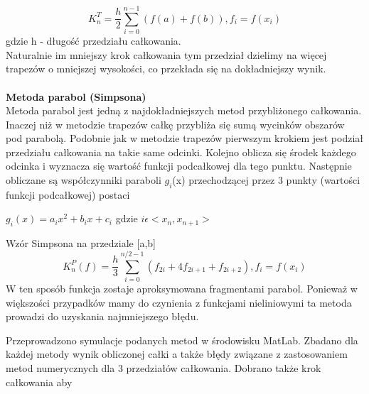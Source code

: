 \documentclass{article}
\begin{document}
		\begin{equation}	
		K_{n}^{T}=\frac{h}{2}\sum_{i=0}^{n-1} \left(f(a)+f(b)\right)  , f_{i} = f\left(x_{i}\right)
		\end{equation}
		gdzie h - długość przedziału całkowania.\\
		Naturalnie im mniejszy krok całkowania tym przedział dzielimy na więcej trapezów o mniejszej wysokości, co przekłada się na dokładniejszy wynik. 
		\\\\
		\textbf {Metoda parabol (Simpsona)}
		\\ 
		Metoda parabol jest jedną z najdokładniejszych metod przybliżonego całkowania. Inaczej niż w metodzie trapezów całkę przybliża się sumą wycinków obszarów pod parabolą. Podobnie jak w metodzie trapezów pierwszym krokiem jest podział przedziału całkowania na takie same odcinki. Kolejno oblicza się środek każdego odcinka i wyznacza się wartość funkcji podcałkowej dla tego punktu. Następnie obliczane są współczynniki paraboli $g_{i}$(x) przechodzącej przez 3 punkty (wartości funkcji podcałkowej) postaci
		\begin{center}$g_{i}(x)=a_{i}x^{2}+b_{i}x+c_{i} $ gdzie $i\epsilon<x_{n},x_{n+1}>$ \end{center}
		Wzór Simpsona na przedziale [a,b]
		\begin{equation}
		K_{n}^{P}(f)=\frac{h}{3}\sum_{i=0}^{n/2-1}(f_{2i}+4f_{2i+1}+f_{2i+2}), f_{i} = f\left(x_{i}\right) 
		\end{equation}
		W ten sposób funkcja zostaje aproksymowana fragmentami parabol. Ponieważ w większości przypadków mamy do czynienia z funkcjami nieliniowymi ta metoda prowadzi do uzyskania najmniejszego błędu.  
		
		
		Przeprowadzono symulacje podanych metod w środowisku MatLab. Zbadano dla każdej metody wynik obliczonej całki a także błędy związane z zastosowaniem metod numerycznych dla 3 przedziałów całkowania. Dobrano także krok całkowania aby 
		
\end{document}

